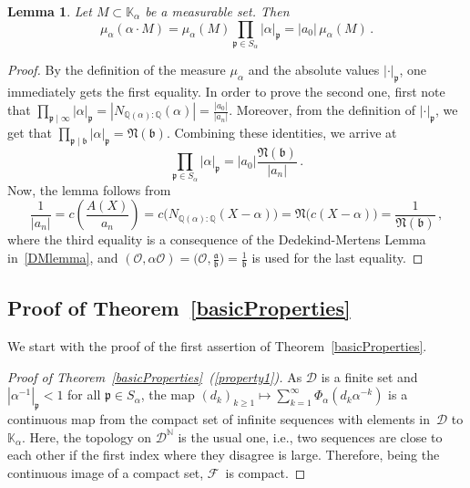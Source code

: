 \documentclass[12pt]{amsart}
\newtheorem{lemma}{Lemma}[section]
\theoremstyle{definition}
\theoremstyle{remark}
\numberwithin{equation}{section}
\begin{document}
\begin{lemma}\label{measuremult}
Let $M \subset \mathbb{K}_\alpha$  be a measurable set. Then
\[
\mu_\alpha(\alpha \cdot M) = \mu_\alpha(M) \prod_{\mathfrak{p}\in S_\alpha} |\alpha|_\mathfrak{p} = |a_0|\, \mu_\alpha(M)\,.
\]
\end{lemma}

\begin{proof}
By the definition of the measure $\mu_\alpha$ and the absolute values $\lvert\cdot\rvert_\mathfrak{p}$, one  immediately gets the first equality. In order to prove the second one, first note that $\prod_{\mathfrak{p}\mid\infty} |\alpha|_\mathfrak{p} = |N_{\mathbb{Q}(\alpha):\mathbb{Q}}(\alpha)| = \frac{|a_0|}{|a_n|}$. Moreover, from the definition of $\lvert\cdot\rvert_\mathfrak{p}$, we get that $\prod_{\mathfrak{p}\mid\mathfrak{b}} |\alpha|_\mathfrak{p} = \mathfrak{N}(\mathfrak{b})$. Combining these identities, we arrive at
\[
\prod_{\mathfrak{p}\in S_\alpha} |\alpha|_\mathfrak{p} = |a_0| \frac{\mathfrak{N}(\mathfrak{b})}{|a_n|}\,.
\]
Now, the lemma follows from
\[
\frac{1}{|a_n|} = c\left(\frac{A(X)}{a_n}\right) = c\big(N_{\mathbb{Q}(\alpha):\mathbb{Q}}(X-\alpha)\big) = \mathfrak{N}\big(c(X-\alpha)\big) = \frac{1}{\mathfrak{N}(\mathfrak{b})}\,,
\]
where the third equality is a consequence of the Dedekind-Mertens Lemma in~\eqref{DMlemma}, and $(\mathcal{O}, \alpha\mathcal{O}) =\big(\mathcal{O}, \frac{\mathfrak{a}}{\mathfrak{b}}\big) = \frac{1}{\mathfrak{b}}$ is used for the last equality.
\end{proof}

\subsection*{Proof of Theorem~\ref{basicProperties}}

We start with the proof of the first assertion of Theorem~\ref{basicProperties}.

\begin{proof}[Proof of Theorem~\ref{basicProperties}~(\ref{property1})]
As $\mathcal{D}$ is a finite set and $|\alpha^{-1}|_\mathfrak{p} < 1$ for all $\mathfrak{p} \in S_\alpha$, the map $(d_k)_{k\ge1} \mapsto \sum_{k=1}^\infty \Phi_\alpha(d_k \alpha^{-k})$ is a continuous map from the compact set of infinite sequences with elements in~$\mathcal{D}$ to $\mathbb{K}_\alpha$. Here, the topology on $\mathcal{D}^\mathbb{N}$ is the usual one, i.e., two sequences are close to each other if the first index where they disagree is large. Therefore, being the continuous image of a compact set, $\mathcal{F}$~is compact.
\end{proof}
\end{document}

